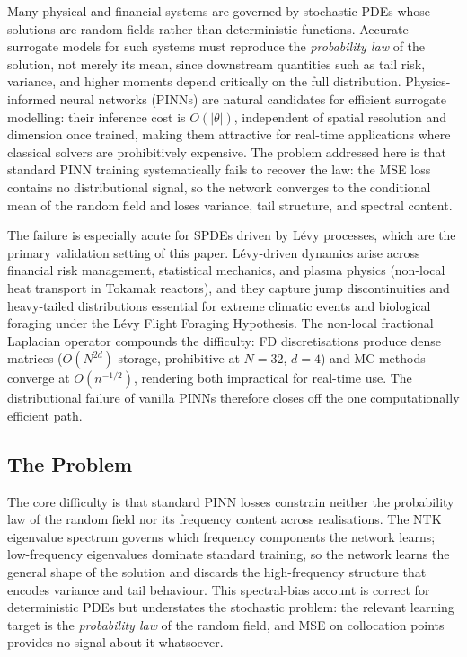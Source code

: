 \documentclass[10pt]{elsarticle}
\begin{document}
Many physical and financial systems are governed by stochastic PDEs
whose solutions are random fields rather than deterministic functions.
Accurate surrogate models for such systems must reproduce the
\emph{probability law} of the solution, not merely its mean, since
downstream quantities such as tail risk, variance, and higher moments
depend critically on the full distribution.
Physics-informed neural networks (PINNs) are natural candidates for
efficient surrogate modelling: their inference cost is \(O(|\theta|)\),
independent of spatial resolution and dimension once trained, making
them attractive for real-time applications where classical solvers are
prohibitively expensive.
The problem addressed here is that standard PINN training systematically
fails to recover the law: the MSE loss contains no distributional
signal, so the network converges to the conditional mean of the random
field and loses variance, tail structure, and spectral content.

The failure is especially acute for SPDEs driven by L\'evy processes,
which are the primary validation setting of this paper.
L\'evy-driven dynamics arise across financial risk management,
statistical mechanics, and plasma physics (non-local heat transport in
Tokamak reactors), and they capture jump discontinuities and
heavy-tailed distributions essential for extreme climatic events and
biological foraging under the L\'evy Flight Foraging Hypothesis.
The non-local fractional Laplacian operator compounds the difficulty:
FD discretisations produce dense matrices (\(O(N^{2d})\) storage,
prohibitive at \(N=32\), \(d=4\)) and MC methods converge at
\(O(n^{-1/2})\), rendering both impractical for real-time use.
The distributional failure of vanilla PINNs therefore closes off the
one computationally efficient path.

\subsection{The Problem}
\label{subsec:problem}

The core difficulty is that standard PINN losses constrain neither the
probability law of the random field nor its frequency content across
realisations. The NTK eigenvalue spectrum governs which frequency
components the network learns; low-frequency eigenvalues dominate
standard training, so the network learns the general shape of the
solution and discards the high-frequency structure that encodes
variance and tail behaviour. This spectral-bias account is correct for
deterministic PDEs but understates the stochastic problem: the
relevant learning target is the \emph{probability law} of the random
field, and MSE on collocation points provides no signal about it
whatsoever.
\end{document}

